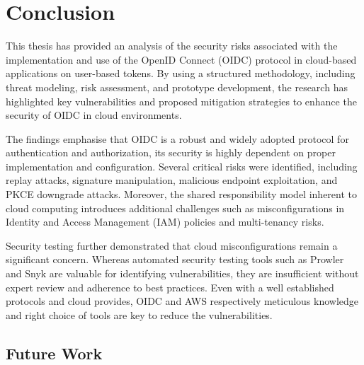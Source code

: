 \chapter{Conclusion}

This thesis has provided an analysis of the security risks associated with the implementation and use of the OpenID Connect (OIDC) protocol in cloud-based applications on user-based tokens. By using a structured methodology, including threat modeling, risk assessment, and prototype development, the research has highlighted key vulnerabilities and proposed mitigation strategies to enhance the security of OIDC in cloud environments.

The findings emphasise that OIDC is a robust and widely adopted protocol for authentication and authorization, its security is highly dependent on proper implementation and configuration. Several critical risks were identified, including replay attacks, signature manipulation, malicious endpoint exploitation, and PKCE downgrade attacks. Moreover, the shared responsibility model inherent to cloud computing introduces additional challenges such as misconfigurations in Identity and Access Management (IAM) policies and multi-tenancy risks.

Security testing further demonstrated that cloud misconfigurations remain a significant concern. Whereas automated security testing tools such as Prowler and Snyk are valuable for identifying vulnerabilities, they are insufficient without expert review and adherence to best practices. Even with a well established protocols and cloud provides, OIDC and AWS respectively meticulous knowledge and right choice of tools are key to reduce the vulnerabilities.   


\section{Future Work}

